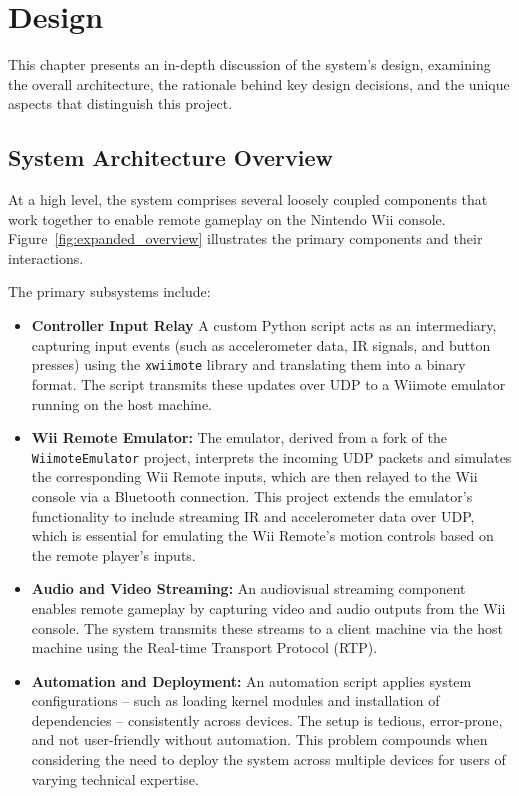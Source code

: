 \chapter{Design}
\label{chapter:design}

This chapter presents an in-depth discussion of the system's design, examining
the overall architecture, the rationale behind key design decisions, and the
unique aspects that distinguish this project.

\section{System Architecture Overview}

At a high level, the system comprises several loosely coupled components that
work together to enable remote gameplay on the Nintendo Wii console.
Figure~\ref{fig:expanded_overview} illustrates the primary components
and their interactions.

The primary subsystems include:
\begin{itemize}
	\item \textbf{Controller Input Relay}
	      A custom Python script acts as an intermediary, capturing input events
	      (such as accelerometer data, IR signals, and button presses) using the
	      \texttt{xwiimote} library\cite{xwiimote} and translating them into a binary
	      format. The script transmits these updates over UDP\cite{wikipediaUDP} to a Wiimote emulator running on the host machine.

	\item \textbf{Wii Remote Emulator:}
	      The emulator, derived from a fork\cite{jr_wiimote_emu} of the
	      \linebreak \texttt{WiimoteEmulator} project\cite{wiimote_emulator}, interprets the incoming
	      UDP packets and simulates the corresponding Wii Remote inputs, which are then
	      relayed to the Wii console via a Bluetooth connection. This project extends the
	      emulator's functionality to include streaming IR and accelerometer data over
	      UDP, which is essential for emulating the Wii Remote's motion controls based on
	      the remote player's inputs.

	\item \textbf{Audio and Video Streaming:}
	      An audiovisual streaming component enables remote gameplay by capturing
	      video and audio outputs from the Wii console. The system transmits these streams
	      to a client machine via the host machine using the Real-time Transport Protocol
	      (RTP)\cite{wikipediaRTP}.

	\item \textbf{Automation and Deployment:}
	      An automation script applies system configurations  -- such as loading
	      kernel modules and installation of dependencies  -- consistently across
	      devices.  The setup is tedious, error-prone, and not user-friendly without
	      automation. This problem compounds when considering the need to deploy the
	      system across multiple devices for users of varying technical expertise.
\end{itemize}

